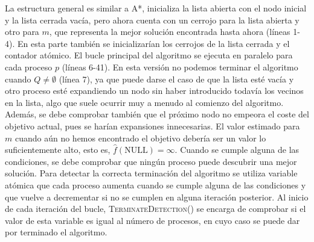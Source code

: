\documentclass[a4paper,12pt]{article}
\begin{document}
La estructura general es similar a A*, inicializa la lista abierta con el nodo inicial y la lista cerrada vacía, pero ahora cuenta con un cerrojo para la lista abierta y otro para $m$, que representa la mejor solución encontrada hasta ahora (líneas 1-4). En esta parte también se inicializarían los cerrojos de la lista cerrada y el contador atómico. El bucle principal del algoritmo se ejecuta en paralelo para cada proceso $p$ (líneas 6-41). En esta versión no podemos terminar el algoritmo cuando $Q\neq \emptyset$ (línea 7), ya que puede darse el caso de que la lista esté vacía y otro proceso esté expandiendo un nodo sin haber introducido todavía los vecinos en la lista, algo que suele ocurrir muy a menudo al comienzo del algoritmo. Además, se debe comprobar también que el próximo nodo no empeora el coste del objetivo actual, pues se harían expansiones innecesarias. El valor estimado para $m$ cuando aún no hemos encontrado el objetivo debería ser un valor lo suficientemente alto, esto es, $\hat{f}(\text{NULL})=\infty$. Cuando se cumple alguna de las condiciones, se debe comprobar que ningún proceso puede descubrir una mejor solución. Para detectar la correcta terminación del algoritmo se utiliza variable atómica que cada proceso aumenta cuando se cumple alguna de las condiciones y que vuelve a decrementar si no se cumplen en alguna iteración posterior. Al inicio de cada iteración del bucle, \textsc{TerminateDetection()} se encarga de comprobar si el valor de esta variable es igual al número de procesos, en cuyo caso se puede dar por terminado el algoritmo. 
\end{document}
